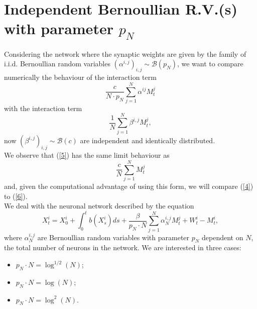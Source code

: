 \section{Independent Bernoullian R.V.(s) with parameter $p_N$}
Considering the network where the synaptic weights are given by the family of i.i.d. Bernoullian random variables $(\alpha^{i, j})_{i, j} \sim \mathcal{B}(p_N)$, we want to compare numerically the behaviour of the interaction term \begin{equation} \label{4} \frac{c}{N \cdot p_N} \sum_{j=1}^N \alpha^{ij} M^j_t \end{equation} with the interaction term 
\begin{equation} \label{5} \frac{1}{N} \sum_{j = 1}^N \beta^{i, j} M^j_t, \end{equation} now $(\beta^{i, j})_{i, j} \sim \mathcal{B}(c)$ are independent and identically distributed. \\
We observe that (\ref{5}) has the same limit behaviour as \begin{equation} \label{6} \frac{c}{N} \sum_{j = 1}^N M^j_t \end{equation} and, given the computational advantage of using this form, we will compare (\ref{4}) to (\ref{6}). \\


We deal with the neuronal network described by the equation \[ X^i_t = X^i_0 + \int_0^t b(X^i_s) ds + \frac{\beta}{p_N \cdot N} \sum_{j = 1}^N \alpha^{i, j}_N M^j_t + W^i_t - M^i_t, \] where $\alpha^{i, j}_N$ are Bernoullian random variables with parameter $p_N$ dependent on $N$, the total number of neurons in the network. We are interested in three cases:
\begin{itemize}
  \item $p_N \cdot N = \log^{1/2}(N)$;
  \item $p_N \cdot N = \log(N)$;
  \item $p_N \cdot N = \log^2(N)$.
\end{itemize}

